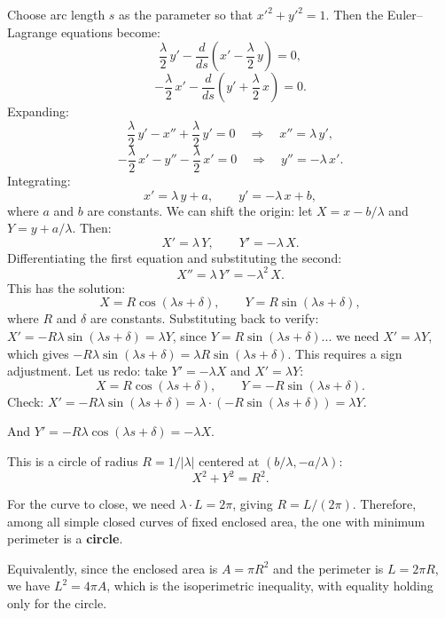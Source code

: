 \documentclass[12pt]{article}
\begin{document}
Choose arc length $s$ as the parameter so that $x'^2 + y'^2 = 1$. Then the Euler--Lagrange equations become:
\[
  \frac{\lambda}{2}\,y' - \frac{d}{ds}\!\left(x' - \frac{\lambda}{2}\,y\right) = 0,
\]
\[
  -\frac{\lambda}{2}\,x' - \frac{d}{ds}\!\left(y' + \frac{\lambda}{2}\,x\right) = 0.
\]
Expanding:
\[
  \frac{\lambda}{2}\,y' - x'' + \frac{\lambda}{2}\,y' = 0
  \quad \Longrightarrow \quad
  x'' = \lambda\,y',
\]
\[
  -\frac{\lambda}{2}\,x' - y'' - \frac{\lambda}{2}\,x' = 0
  \quad \Longrightarrow \quad
  y'' = -\lambda\,x'.
\]
Integrating:
\[
  x' = \lambda\,y + a, \qquad y' = -\lambda\,x + b,
\]
where $a$ and $b$ are constants. We can shift the origin: let $X = x - b/\lambda$ and $Y = y + a/\lambda$. Then:
\[
  X' = \lambda\,Y, \qquad Y' = -\lambda\,X.
\]
Differentiating the first equation and substituting the second:
\[
  X'' = \lambda\,Y' = -\lambda^2\,X.
\]
This has the solution:
\[
  X = R\cos(\lambda s + \delta), \qquad Y = R\sin(\lambda s + \delta),
\]
where $R$ and $\delta$ are constants. Substituting back to verify: $X' = -R\lambda\sin(\lambda s+\delta) = \lambda Y$, since $Y = R\sin(\lambda s+\delta)$... we need $X' = \lambda Y$, which gives $-R\lambda\sin(\lambda s+\delta) = \lambda R\sin(\lambda s + \delta)$. This requires a sign adjustment. Let us redo: take $Y' = -\lambda X$ and $X' = \lambda Y$:
\[
  X = R\cos(\lambda s + \delta), \qquad Y = -R\sin(\lambda s + \delta).
\]
Check: $X' = -R\lambda\sin(\lambda s+\delta) = \lambda \cdot (-R\sin(\lambda s+\delta)) = \lambda Y$. \checkmark

And $Y' = -R\lambda\cos(\lambda s+\delta) = -\lambda X$. \checkmark

This is a circle of radius $R = 1/|\lambda|$ centered at $(b/\lambda, -a/\lambda)$:
\[
  X^2 + Y^2 = R^2.
\]

For the curve to close, we need $\lambda \cdot L = 2\pi$, giving $R = L/(2\pi)$. Therefore, among all simple closed curves of fixed enclosed area, the one with minimum perimeter is a \textbf{circle}.

\medskip
Equivalently, since the enclosed area is $A = \pi R^2$ and the perimeter is $L = 2\pi R$, we have $L^2 = 4\pi A$, which is the isoperimetric inequality, with equality holding only for the circle.
\end{document}
